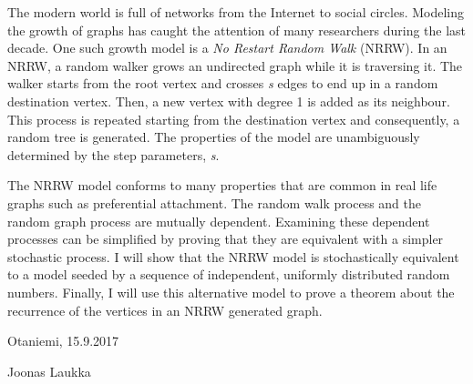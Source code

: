 \documentclass[finnish, 12pt, a4paper, sci, utf8, pdfa]{aaltothesis}
\begin{document}
\newpage
\begin{abstractpage}[english]
The modern world is full of networks from the Internet to social circles. Modeling the growth
of graphs has caught the attention of many researchers during the last decade. One such growth model
is a \textit{No Restart Random Walk} (NRRW). In an NRRW, a random walker grows
an undirected graph while it is traversing it. The walker starts from the root vertex and crosses \textit{s}
edges to end up in a random destination vertex. Then, a new vertex with degree 1 is added as its neighbour. 
This process is repeated starting from the destination vertex and consequently, a random tree is generated. 
The properties of the model are unambiguously determined by the step parameters, \textit{s}.

The NRRW model conforms to many properties that are common in real life graphs such as
preferential attachment. The random walk process and the random graph process are
mutually dependent. Examining these dependent processes can be simplified by proving that they
are equivalent with a simpler stochastic process. I will show that the NRRW model is stochastically
equivalent to a model seeded by a sequence of independent, uniformly distributed random numbers. Finally, I
will use this alternative model to prove a theorem about the recurrence of the vertices in an NRRW 
generated graph.
\end{abstractpage}

\newpage



\vspace{5cm}
Otaniemi, 15.9.2017

\vspace{5mm}
{\hfill Joonas Laukka \hspace{1cm}}

\newpage
\end{document}

